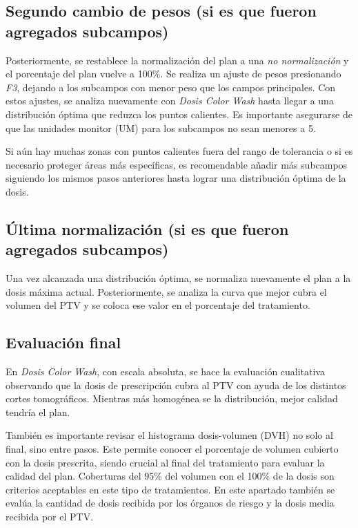\documentclass{article}
\begin{document}
\subsection{Segundo cambio de pesos (si es que fueron agregados subcampos)}

Posteriormente, se restablece la normalización del plan a una \textit{no normalización} y el porcentaje del plan vuelve a 100\%. Se realiza un ajuste de pesos presionando \textit{F3}, dejando a los subcampos con menor peso que los campos principales. Con estos ajustes, se analiza nuevamente con \textit{Dosis Color Wash} hasta llegar a una distribución óptima que reduzca los puntos calientes. Es importante asegurarse de que las unidades monitor (UM) para los subcampos no sean menores a 5.

Si aún hay muchas zonas con puntos calientes fuera del rango de tolerancia o si es necesario proteger áreas más específicas, es recomendable añadir más subcampos siguiendo los mismos pasos anteriores hasta lograr una distribución óptima de la dosis.

\subsection{Última normalización (si es que fueron agregados subcampos)}

Una vez alcanzada una distribución óptima, se normaliza nuevamente el plan a la dosis máxima actual. Posteriormente, se analiza la curva que mejor cubra el volumen del PTV y se coloca ese valor en el porcentaje del tratamiento.

\subsection{Evaluación final}

En \textit{Dosis Color Wash}, con escala absoluta, se hace la evaluación cualitativa observando que la dosis de prescripción cubra al PTV con ayuda de los distintos cortes tomográficos. Mientras más homogénea se la distribución, mejor calidad tendría el plan.

También es importante revisar el histograma dosis-volumen (DVH) no solo al final, sino entre pasos. Este permite conocer el porcentaje de volumen cubierto con la dosis prescrita, siendo crucial al final del tratamiento para evaluar la calidad del plan. Coberturas del 95\% del volumen con el 100\% de la dosis son criterios aceptables en este tipo de tratamientos. En este apartado también se evalúa la cantidad de dosis recibida por los órganos de riesgo y la dosis media recibida por el PTV.
\end{document}

